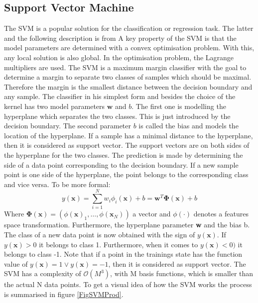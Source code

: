 \subsection{Support Vector Machine}\label{EmSubSecSVM}
The \acs{SVM} is a popular solution for the classification or regression task. The latter and the following description is from \cite[p. 325-337]{Bishop.2009}
A key property of the \acs{SVM} is that the model parameters are determined with a convex optimisation problem.
With this, any local solution is also global.
In the optimisation problem, the Lagrange multipliers are used.
The \acs{SVM} is a maximum margin classifier with the goal to determine a margin to separate two classes of samples which should be maximal. 
Therefore the margin is the smallest distance between the decision boundary and any sample.
The classifier in his simplest form and besides the choice of the kernel has two model parameters $\mathbf{w}$ and $b$. 
The first one is modelling the hyperplane which separates the two classes.
This is just introduced by the decision boundary. 
The second parameter $b$ is called the bias and models the location of the hyperplane.
If a sample has a minimal distance to the hyperplane, then it is considered as support vector.
The support vectors are on both sides of the hyperplane for the two classes.
The prediction is made by determining the side of a data point corresponding to the decision boundary.
If a new sample point is one side of the hyperplane, the point belongs to the corresponding class and vice versa. To be more formal: 
\begin{equation}\label{EqSVMPred}
	y(\textbf{x}) = \sum_{i=1}^{N} w_i \phi_i(\mathbf{x}) + b= \textbf{w}^T \mathbf{\Phi}(\textbf{x}) + b
\end{equation}
Where $\mathbf{\Phi(x)}= (\phi(\mathbf{x})_1,\dots,\phi(\mathbf{x}_N))$ a vector and $\phi(\cdot)$ denotes a features space transformation.
Furthermore, the hyperplane parameter \textbf{w} and the bias b.
The class of a new data point is now obtained with the sign of $y(\textbf{x})$. If $y(\textbf{x}) > 0$ it belongs to class 1.
Furthermore, when it comes to $y(\textbf{x}) < 0)$ it belongs to class -1.
Note that if a point in the trainings state has the function value of $y(\textbf{x}) = 1 \vee y(\textbf{x}) = -1$, then it is considered as support vector.
The \ac{SVM} has a complexity of $\mathcal{O}(M^3)$, with M basis functions, which is smaller than the actual N data points.
To get a visual idea of how the \ac{SVM} works the process is summarised in figure \ref{FigSVMProd}. \\
